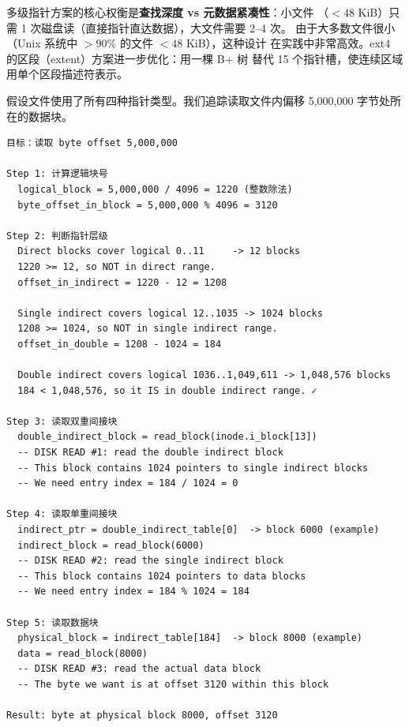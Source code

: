 \begin{filesystemlayout}
\begin{keyidea}
多级指针方案的核心权衡是\textbf{查找深度 vs 元数据紧凑性}：小文件
（$< 48$ KiB）只需 1 次磁盘读（直接指针直达数据），大文件需要 2--4 次。
由于大多数文件很小（Unix 系统中 $> 90\%$ 的文件 $< 48$ KiB），这种设计
在实践中非常高效。ext4 的区段（extent）方案进一步优化：用一棵 B+ 树
替代 15 个指针槽，使连续区域用单个区段描述符表示。
\end{keyidea}


假设文件使用了所有四种指针类型。我们追踪读取文件内偏移
5,000,000 字节处所在的数据块。

\begin{lstlisting}
目标：读取 byte offset 5,000,000

Step 1: 计算逻辑块号
  logical_block = 5,000,000 / 4096 = 1220 (整数除法)
  byte_offset_in_block = 5,000,000 % 4096 = 3120

Step 2: 判断指针层级
  Direct blocks cover logical 0..11     -> 12 blocks
  1220 >= 12, so NOT in direct range.
  offset_in_indirect = 1220 - 12 = 1208

  Single indirect covers logical 12..1035 -> 1024 blocks
  1208 >= 1024, so NOT in single indirect range.
  offset_in_double = 1208 - 1024 = 184

  Double indirect covers logical 1036..1,049,611 -> 1,048,576 blocks
  184 < 1,048,576, so it IS in double indirect range. ✓

Step 3: 读取双重间接块
  double_indirect_block = read_block(inode.i_block[13])
  -- DISK READ #1: read the double indirect block
  -- This block contains 1024 pointers to single indirect blocks
  -- We need entry index = 184 / 1024 = 0

Step 4: 读取单重间接块
  indirect_ptr = double_indirect_table[0]  -> block 6000 (example)
  indirect_block = read_block(6000)
  -- DISK READ #2: read the single indirect block
  -- This block contains 1024 pointers to data blocks
  -- We need entry index = 184 % 1024 = 184

Step 5: 读取数据块
  physical_block = indirect_table[184]  -> block 8000 (example)
  data = read_block(8000)
  -- DISK READ #3: read the actual data block
  -- The byte we want is at offset 3120 within this block

Result: byte at physical block 8000, offset 3120
\end{lstlisting}



\end{filesystemlayout}
